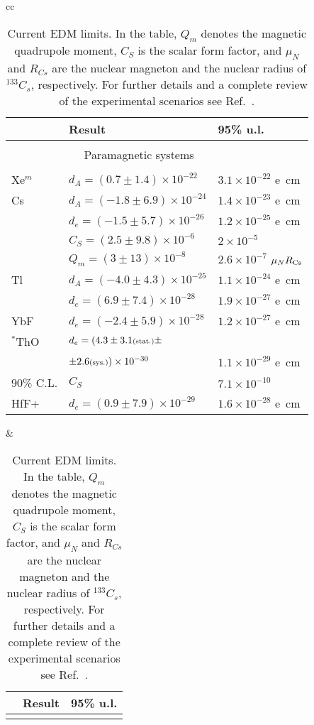 {\setlength{\tabcolsep}{2pt} %
\begin{table}
\caption{Current EDM limits. In the table, $Q_m$ denotes the magnetic quadrupole moment, $C_S$ is the scalar form factor, and  $\mu_N$ and $R_{Cs}$ are the nuclear magneton and the nuclear radius of $^{133}C_s$, respectively. For 
further details and a complete review of the experimental 
scenarios see Ref.~\cite{Chupp:2017rkp}. } 
\label{tab:EDM_all} 
{\scriptsize
 \begin{center}
\begin{tabular}{cc}
 \begin{tabular}{lll}
\hline\hline
 & Result & 95\% u.l.\\ \hline 
 \\
& $\quad$ Paramagnetic  systems
 & \\ 
 \hline
 \\
Xe$^m$ & $d_A = (0.7\pm 1.4)\times 10^{-22}$ & $3.1 \times 10^{-22}$ 
e\, cm\\
Cs & $d_A =(-1.8 \pm 6.9) \times 10^{-24}$ &
$1.4 \times 10^{-23}$ 
e\, cm\\ 
& $d_e =(-1.5 \pm 5.7) \times 10^{-26}$& $1.2 \times 10^{-25}$ e\, cm\\ 
& $C_S =(2.5 \pm 9.8) \times 10^{-6}$& $2 \times 10^{-5}$\\
& $Q_m =(3 \pm 13) \times 10^{-8}$& $2.6 \times 10^{-7}$ $\mu_N R_{\rm{Cs}}$\\
Tl &$d_A =(-4.0\pm 4.3) \times 10^{-25}$ & $1.1 \times 10^{-24}$ e\, cm \\
& $d_e =(6.9 \pm 7.4) \times 10^{-28}$& $1.9 \times 10^{-27}$ e\, cm\\
YbF & $d_e =(-2.4 \pm 5.9) \times 10^{-28}$& $1.2 \times 10^{-27}$
e\, cm\\
$^*$ThO & $d_e =(4.3 \pm 3.1 \text{\scriptsize (stat.)}\pm$ \\
& $\pm 2.6 \text{\scriptsize (sys.)}) \times 10^{-30}$& 
$1.1 \times 10^{-29}$ e\, cm\\
{\scriptsize*90\% C.L.}& $C_S$ &$7.1 \times 10^{-10}$ \\
HfF+ & $d_e =(0.9 \pm 7.9) \times 10^{-29}$& 
$1.6 \times 10^{-28}$ 
e\, cm\\
\hline\hline
 \end{tabular}
\hspace*{2mm}&\hspace*{2mm}
\begin{tabular}{lll}
\hline\hline
 & Result & 95\% u.l.\\ \hline 
 \\

\end{tabular}
\end{tabular}
\end{center}}
\end{table}}
